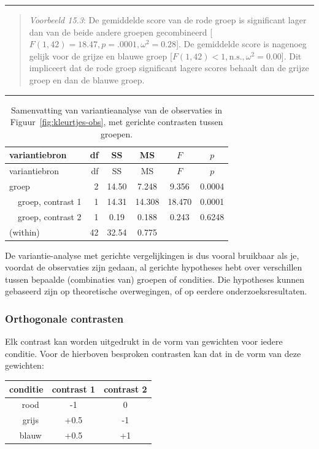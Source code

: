 \documentclass[
]{book}
\begin{document}
\begin{center}\rule{0.5\linewidth}{0.5pt}\end{center}

\begin{quote}
\emph{Voorbeeld 15.3}:
De gemiddelde score van de rode
groep is significant lager dan van de beide andere groepen gecombineerd
{[}\(F(1,42)=18.47, p=.0001, \omega^2=0.28\){]}. De gemiddelde score is
nagenoeg gelijk voor de grijze en blauwe groep
{[}\(F(1,42)<1, \textrm{n.s.}, \omega^2=0.00\){]}.
Dit impliceert dat de
rode groep significant lagere scores behaalt dan de grijze groep en dan
de blauwe groep.
\end{quote}

\begin{center}\rule{0.5\linewidth}{0.5pt}\end{center}

\begin{longtable}[]{@{}lrcccc@{}}
\caption{\label{tab:kleurtjes-anova-contrast} Samenvatting van variantieanalyse van de observaties in Figuur~\ref{fig:kleurtjes-obs}, met gerichte contrasten tussen groepen.}\tabularnewline
\toprule
variantiebron & df & SS & MS & \(F\) & \(p\)\tabularnewline
\midrule
\endfirsthead
\toprule
variantiebron & df & SS & MS & \(F\) & \(p\)\tabularnewline
\midrule
\endhead
groep & 2 & 14.50 & 7.248 & 9.356 & 0.0004\tabularnewline
~~groep, contrast 1 & 1 & 14.31 & 14.308 & 18.470 & 0.0001\tabularnewline
~~groep, contrast 2 & 1 & 0.19 & 0.188 & 0.243 & 0.6248\tabularnewline
(within) & 42 & 32.54 & 0.775 & &\tabularnewline
\bottomrule
\end{longtable}

De variantie-analyse met gerichte vergelijkingen is dus vooral bruikbaar
als je, voordat de observaties zijn gedaan, al gerichte hypotheses hebt
over verschillen tussen bepaalde (combinaties van) groepen of condities.
Die hypotheses kunnen gebaseerd zijn op theoretische overwegingen, of op
eerdere onderzoeksresultaten.

\hypertarget{sec:anova-oneway-contrasts}{%
\subsubsection{Orthogonale contrasten}\label{sec:anova-oneway-contrasts}}

Elk contrast kan worden uitgedrukt in de vorm van gewichten voor iedere
conditie. Voor de hierboven besproken contrasten kan dat in de vorm van
deze gewichten:

\begin{longtable}[]{@{}ccc@{}}
\toprule
conditie & contrast 1 & contrast 2\tabularnewline
\midrule
\endhead
~~rood & -1 & 0\tabularnewline
~~grijs & +0.5 & -1\tabularnewline
~~blauw & +0.5 & +1\tabularnewline
\bottomrule
\end{longtable}
\end{document}
